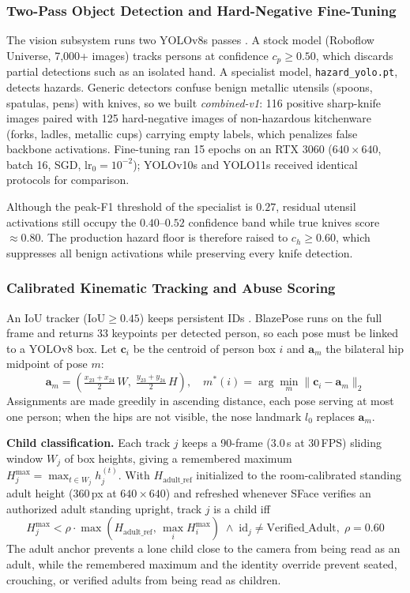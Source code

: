 \documentclass[conference]{IEEEtran}
\begin{document}
\subsubsection{Two-Pass Object Detection and Hard-Negative Fine-Tuning}
The vision subsystem runs two YOLOv8s passes \cite{b18, b21}. A stock model (Roboflow Universe, 7,000+ images) tracks persons at confidence $c_p \ge 0.50$, which discards partial detections such as an isolated hand. A specialist model, \texttt{hazard\_yolo.pt}, detects hazards. Generic detectors confuse benign metallic utensils (spoons, spatulas, pens) with knives, so we built \textit{combined-v1}: 116 positive sharp-knife images paired with 125 hard-negative images of non-hazardous kitchenware (forks, ladles, metallic cups) carrying empty labels, which penalizes false backbone activations. Fine-tuning ran 15 epochs on an RTX 3060 ($640 \times 640$, batch 16, SGD, $\text{lr}_0 = 10^{-2}$); YOLOv10s and YOLO11s received identical protocols for comparison.

Although the peak-F1 threshold of the specialist is $0.27$, residual utensil activations still occupy the $0.40$--$0.52$ confidence band while true knives score $\approx 0.80$. The production hazard floor is therefore raised to $c_h \ge 0.60$, which suppresses all benign activations while preserving every knife detection.

\subsubsection{Calibrated Kinematic Tracking and Abuse Scoring}
An IoU tracker ($\text{IoU} \ge 0.45$) keeps persistent IDs \cite{b21}. BlazePose \cite{b13} runs on the full frame and returns 33 keypoints per detected person, so each pose must be linked to a YOLOv8 box. Let $\mathbf{c}_i$ be the centroid of person box $i$ and $\mathbf{a}_m$ the bilateral hip midpoint of pose $m$:
\begin{equation}
\mathbf{a}_m = \left(\tfrac{x_{23}+x_{24}}{2}\,W,\; \tfrac{y_{23}+y_{24}}{2}\,H\right), \quad m^{*}(i) = \arg\min_{m} \lVert \mathbf{c}_i - \mathbf{a}_m \rVert_2 \label{eq_assign}
\end{equation}
Assignments are made greedily in ascending distance, each pose serving at most one person; when the hips are not visible, the nose landmark $l_0$ replaces $\mathbf{a}_m$.

\textbf{Child classification.} Each track $j$ keeps a 90-frame (3.0\,s at 30\,FPS) sliding window $W_j$ of box heights, giving a remembered maximum $H_j^{\max} = \max_{t \in W_j} h_j^{(t)}$. With $H_{\text{adult\_ref}}$ initialized to the room-calibrated standing adult height (360\,px at $640\times640$) and refreshed whenever SFace verifies an authorized adult standing upright, track $j$ is a child iff
\begin{equation}
H_j^{\max} < \rho \cdot \max\!\left(H_{\text{adult\_ref}},\, \max_{i} H_i^{\max}\right) \;\land\; \text{id}_j \ne \text{Verified\_Adult}, \; \rho = 0.60 \label{eq_child}
\end{equation}
The adult anchor prevents a lone child close to the camera from being read as an adult, while the remembered maximum and the identity override prevent seated, crouching, or verified adults from being read as children.
\end{document}
